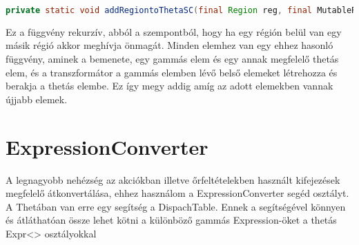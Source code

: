 \begin{lstlisting}[language=java ,breaklines=true]
private static void addRegiontoThetaSC(final Region reg, final MutableRegion r) 
\end{lstlisting}

Ez a függvény rekurzív, abból a szempontból, hogy ha egy régión belül van egy másik régió akkor meghívja önmagát. Minden elemhez van egy ehhez hasonló függvény, aminek a bemenete, egy gammás elem és egy annak megfelelő thetás elem, és a transzformátor a gammás elemben lévő belső elemeket létrehozza és berakja a thetás elembe. Ez így megy addig amíg az adott elemekben vannak újjabb elemek.

\section{ExpressionConverter}

A legnagyobb nehézség az akciókban illetve őrfeltételekben használt kifejezések megfelelő átkonvertálása, ehhez használom a ExpressionConverter segéd osztályt. A Thetában van erre egy segítség a DispachTable. Ennek a segítségével könnyen és átláthatóan össze lehet kötni a különböző gammás Expression-öket a thetás Expr<> osztályokkal
